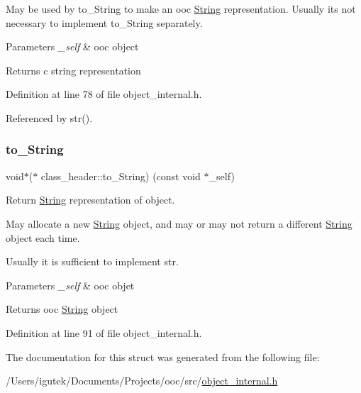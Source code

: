 May be used by to\+\_\+\+String to make an ooc \mbox{\hyperlink{structString}{String}} representation. Usually it\textquotesingle{}s not necessary to implement to\+\_\+\+String separately.


\begin{DoxyParams}{Parameters}
{\em \+\_\+self} & ooc object \\
\hline
\end{DoxyParams}
\begin{DoxyReturn}{Returns}
c string representation 
\end{DoxyReturn}


Definition at line 78 of file object\+\_\+internal.\+h.



Referenced by str().

\mbox{\label{structclass__header_a67a4f888ffa78b4905bc3585fe1f17a4}} 
\subsubsection{\texorpdfstring{to\+\_\+\+String}{to\_String}}
{\footnotesize\ttfamily void$\ast$($\ast$ class\+\_\+header\+::to\+\_\+\+String) (const void $\ast$\+\_\+self)}

Return \mbox{\hyperlink{structString}{String}} representation of object.

May allocate a new \mbox{\hyperlink{structString}{String}} object, and may or may not return a different \mbox{\hyperlink{structString}{String}} object each time.

Usually it is sufficient to implement str.


\begin{DoxyParams}{Parameters}
{\em \+\_\+self} & ooc objet \\
\hline
\end{DoxyParams}
\begin{DoxyReturn}{Returns}
ooc \mbox{\hyperlink{structString}{String}} object 
\end{DoxyReturn}


Definition at line 91 of file object\+\_\+internal.\+h.



The documentation for this struct was generated from the following file\+:\begin{DoxyCompactItemize}
\item 
/\+Users/igutek/\+Documents/\+Projects/ooc/src/\mbox{\hyperlink{object__internal_8h}{object\+\_\+internal.\+h}}\end{DoxyCompactItemize}
